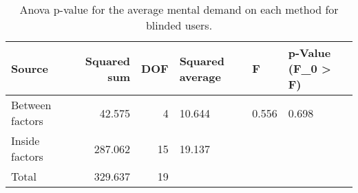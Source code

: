 
\begin{table}[!htb]
\centering
\caption{Anova p-value for the average mental demand on each method for blinded users.}
\label{tab:anova_mental_demand_avg}
\begin{tabular}{lrrlll}
\toprule
         Source &  Squared sum &  DOF & Squared average &     F & p-Value (F\_0 > F) \\
\midrule
Between factors &       42.575 &    4 &          10.644 & 0.556 &             0.698 \\
 Inside factors &      287.062 &   15 &          19.137 &       &                   \\
          Total &      329.637 &   19 &                 &       &                   \\
\bottomrule
\end{tabular}
\end{table}

